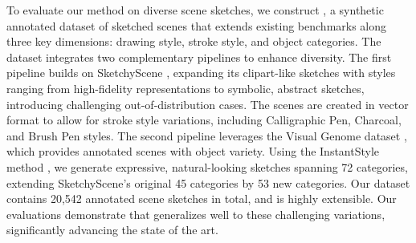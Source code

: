 To evaluate our method on diverse scene sketches, we construct \datasetname{}, a synthetic annotated dataset of sketched scenes that extends existing benchmarks along three key dimensions: drawing style, stroke style, and object categories. The dataset integrates two complementary pipelines to enhance diversity.
The first pipeline builds on SketchyScene \cite{Zou18SketchyScene}, expanding its clipart-like sketches with styles ranging from high-fidelity representations to symbolic, abstract sketches, introducing challenging out-of-distribution cases. The scenes are created in vector format to allow for stroke style variations, including Calligraphic
Pen, Charcoal, and Brush Pen styles.
The second pipeline leverages the Visual Genome dataset \cite{VisualGenome2017}, which provides annotated scenes with object variety. Using the InstantStyle method \cite{Wang2024InstantStyleFL}, we generate expressive, natural-looking sketches spanning 72 categories, extending SketchyScene's original 45 categories by 53 new categories. Our dataset contains 20,542 annotated scene sketches in total, and is highly extensible.
Our evaluations demonstrate that \methodname{} generalizes well to these challenging variations, significantly advancing the state of the art. 







